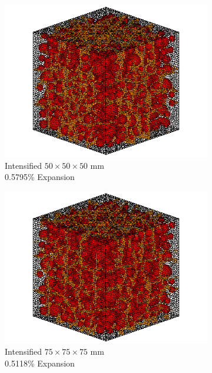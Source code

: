 \begin{figure}[ht!]
    \begin{subfigure}{.3\textwidth}
      \centering
      \includegraphics[width=.9\linewidth]{Files/exp_3D/DEF/A30X0C_3_c.png}
    \caption{Intensified $50 \times 50 \times 50$ mm \\  0.5795\% Expansion}
    \end{subfigure}%
    \begin{subfigure}{.3\textwidth}
      \centering
      \includegraphics[width=.9\linewidth]{Files/exp_3D/DEF/A30X-5C_3_c.png}
    \caption{Intensified $75 \times 75 \times 75$ mm  \\ 0.5118\% Expansion}
    \end{subfigure}
    \begin{subfigure}{.3\textwidth}
      \centering

\end{subfigure}
\end{figure}
